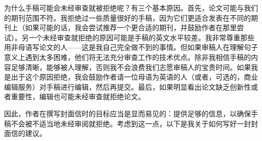 为什么手稿可能会未经审查就被拒绝呢？有三个基本原因。首先，论文可能与我们的期刊范围不符。我拒绝过一些质量很好的手稿，因为它们更适合发表在不同的期刊上（如果可能的话，我会尝试推荐一个更合适的期刊，并鼓励作者在那里尝试）。另一个未经审查就拒绝的原因可能是手稿的英文水平较差。我非常尊重那些用非母语写论文的人——这是我自己完全做不到的事情。但如果审稿人在理解句子意义上遇到太多困难，他们将无法充分审查工作的技术优点。除非我相信手稿的内容足够清晰，能够被人理解，否则我不会浪费我们志愿审稿人的宝贵时间。如果我是出于这个原因拒绝，我会鼓励作者请一位母语为英语的人（或者，可选的，商业编辑服务）对手稿进行编辑，然后再提交。最后，如果明显看出论文缺乏创新性或者重要性，编辑也可能未经审查就拒绝论文。

因此，作者在撰写封面信时的目标应当是显而易见的：提供足够的信息，以确保手稿不会被不适当地未经审阅就拒绝。考虑到这一点，以下是我关于如何写好一封封面信的建议。

